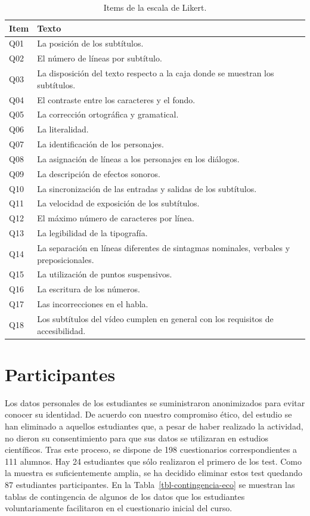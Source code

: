 \documentclass[
  12pt,
  a4paper,
  extrafontsizes,
  onecolumn,
  openright,
  table]{memoir}
\begin{document}
\hypertarget{tbl-likert-scale}{}
\begin{longtable}{ll}
\caption{\label{tbl-likert-scale}Items de la escala de Likert. }\tabularnewline

\toprule
Item & Texto \\ 
\midrule
Q01 & La posición de los subtítulos. \\ 
Q02 & El número de líneas por subtítulo. \\ 
Q03 & La disposición del texto respecto a la caja donde se muestran los subtítulos. \\ 
Q04 & El contraste entre los caracteres y el fondo. \\ 
Q05 & La corrección ortográfica y gramatical. \\ 
Q06 & La literalidad. \\ 
Q07 & La identificación de los personajes. \\ 
Q08 & La asignación de líneas a los personajes en los diálogos. \\ 
Q09 & La descripción de efectos sonoros. \\ 
Q10 & La sincronización de las entradas y salidas de los subtítulos. \\ 
Q11 & La velocidad de exposición de los subtítulos. \\ 
Q12 & El máximo número de caracteres por línea. \\ 
Q13 & La legibilidad de la tipografía. \\ 
Q14 & La separación en líneas diferentes de sintagmas nominales, verbales y preposicionales. \\ 
Q15 & La utilización de puntos suspensivos. \\ 
Q16 & La escritura de los números. \\ 
Q17 & Las incorrecciones en el habla. \\ 
Q18 & Los subtítulos del vídeo cumplen en general con los requisitos de accesibilidad. \\ 
\bottomrule
\end{longtable}

\hypertarget{participantes}{%
\section{Participantes}\label{participantes}}

Los datos personales de los estudiantes se suministraron anonimizados
para evitar conocer su identidad. De acuerdo con nuestro compromiso
ético, del estudio se han eliminado a aquellos estudiantes que, a pesar
de haber realizado la actividad, no dieron su consentimiento para que
sus datos se utilizaran en estudios científicos. Tras este proceso, se
dispone de 198 cuestionarios correspondientes a 111 alumnos. Hay 24
estudiantes que sólo realizaron el primero de los test. Como la muestra
es suficientemente amplia, se ha decidido eliminar estos test quedando
87 estudiantes participantes. En la Tabla~\ref{tbl-contingencia-eco} se
muestran las tablas de contingencia de algunos de los datos que los
estudiantes voluntariamente facilitaron en el cuestionario inicial del
curso.
\end{document}
